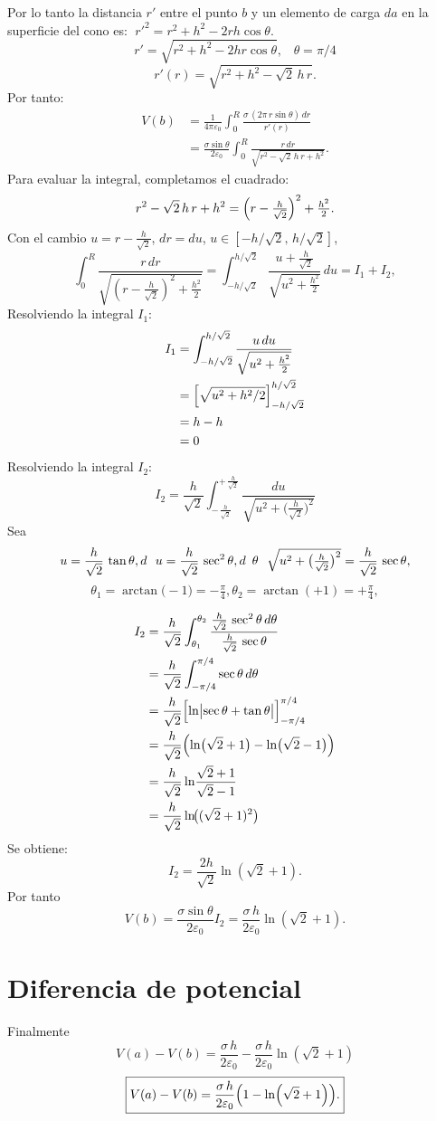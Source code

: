 \documentclass[12pt,letterpaper]{article}
\begin{document}
Por lo tanto la distancia \(r'\) entre el punto \(b\) y un elemento de carga \(da\) en la superficie del cono es:
\(\;r'^2 = r^2 + h^2 - 2rh\cos\theta.\)
\[
  r'=\sqrt{r^2 + h^2 - 2hr\cos\theta} , \,\,\,\,\,\theta = \pi/4
\]
\[
r'(r)=\sqrt{r^2 + h^2 - \sqrt2\,h\,r }.
\]
Por tanto:
\begin{align*}
V(b)
&=\frac{1}{4\pi\varepsilon_0}\int_{0}^{R}\frac{\sigma\,(2\pi\,r\sin\theta)\,dr}{r'(r)}\\
&=\frac{\sigma\sin\theta}{2\varepsilon_0}\int_{0}^{R}\frac{r\,dr}{\sqrt{r^2 - \sqrt2\,h\,r + h^2}}.
\end{align*}
Para evaluar la integral, completamos el cuadrado:
\[
  r^2 - \sqrt2\,h\,r + h^2
  =\Bigl(r-\tfrac{h}{\sqrt2}\Bigr)^2 + \tfrac{h^2}{2}.
\]
Con el cambio $u=r-\tfrac{h}{\sqrt2}$, $dr=du$, $u\in[-h/\sqrt2,\,h/\sqrt2]$,
\[
\int_{0}^{R}\frac{r\,dr}{\sqrt{(r-\tfrac{h}{\sqrt2})^2+\tfrac{h^2}{2}}}
=\int_{-h/\sqrt2}^{h/\sqrt2}\frac{u+\tfrac{h}{\sqrt2}}{\sqrt{u^2+\tfrac{h^2}{2}}}\,du
=I_1+I_2,
\]
Resolviendo la integral \(I_1\):
\begin{align*}
  I_1&=\int_{-h/\sqrt2}^{h/\sqrt2}\frac{u\,du}{\sqrt{u^2+\tfrac{h^2}{2}}}\\ 
     & =\Bigl[ \sqrt{u^2+h^2/2}\Bigr]_{-h/\sqrt2}^{h/\sqrt2}\\
     & =h-h\\
     & = 0
\end{align*}
Resolviendo la integral \(I_2\):
\[
I_2 = \frac{h}{\sqrt2}
\int_{-\,\frac{h}{\sqrt2}}^{+\,\frac{h}{\sqrt2}}
\frac{du}{\sqrt{u^2 + \bigl(\tfrac{h}{\sqrt2}\bigr)^2}}
\]
Sea 
\[
u = \frac{h}{\sqrt2}\,\tan\theta,d\,\,\,\,u = \frac{h}{\sqrt2}\,\sec^2\theta,d\,\,\,\theta\,\,\,\, \sqrt{u^2 + \bigl(\tfrac{h}{\sqrt2}\bigr)^2} = \frac{h}{\sqrt2}\,\sec\theta,\\[6pt]
\]
\[
\theta_1 = \arctan\!\bigl(-1\bigr) = -\tfrac\pi4,
\theta_2 = \arctan\!(+1) = +\tfrac\pi4,
\]

\begin{align*}
I_2
&= \frac{h}{\sqrt2}
    \int_{\theta_1}^{\theta_2}
      \frac{\frac{h}{\sqrt2}\,\sec^2\theta\,d\theta}
           {\frac{h}{\sqrt2}\,\sec\theta}
\\
&= \frac{h}{\sqrt2}
    \int_{-\pi/4}^{\pi/4}
      \sec\theta\,d\theta
\\
&= \frac{h}{\sqrt2}
    \Bigl[\ln\bigl|\sec\theta + \tan\theta\bigr|\Bigr]_{-\pi/4}^{\pi/4}
\\
&= \frac{h}{\sqrt2}\Bigl(
      \ln\bigl(\sqrt2+1\bigr)
    - \ln\bigl(\sqrt2-1\bigr)
    \Bigr)
\\
&= \frac{h}{\sqrt2}\ln\!\frac{\sqrt2+1}{\sqrt2-1}
\\
&= \frac{h}{\sqrt2}\ln\!\bigl((\sqrt2+1)^2\bigr)
\end{align*}
Se obtiene:
\[
I_2 = \frac{2h}{\sqrt2}\ln(\sqrt2+1).
\]
Por tanto
\[
V(b)
=\frac{\sigma\sin\theta}{2\varepsilon_0}I_2
=\frac{\sigma\,h}{2\varepsilon_0}\ln(\sqrt2+1).
\]

\section*{Diferencia de potencial}
Finalmente
\[
V(a)-V(b)
=\frac{\sigma\,h}{2\varepsilon_0}
-\frac{\sigma\,h}{2\varepsilon_0}\ln(\sqrt2+1)
\]
\[
\boxed{V(a)-V(b)=\frac{\sigma\,h}{2\varepsilon_0}\Bigl(1-\ln(\sqrt2+1)\Bigr).}
\]
\end{document}
